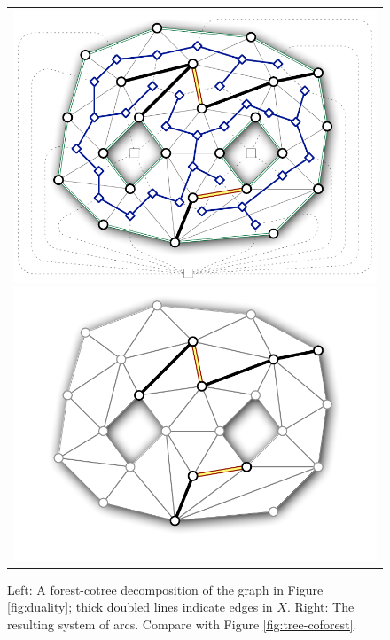 \begin{figure}[htb]
\centering\footnotesize\sf
\begin{tabular}{c}
\includegraphics[scale=0.45]{Fig/forest-cotree2} \qquad
\includegraphics[scale=0.45]{Fig/forest-cotree-arcs2}
\end{tabular}
\caption{Left: A forest-cotree decomposition of the graph in Figure \ref{fig:duality}; thick doubled lines indicate edges in $X$.
Right: The resulting system of arcs.  Compare with Figure \ref{fig:tree-coforest}.}
\label{fig:forest-cotree}
\end{figure}

